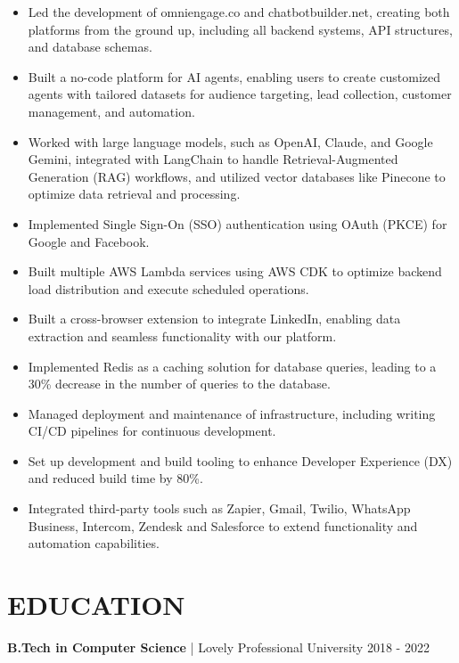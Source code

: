 \documentclass[]{resume}
\begin{document}
\begin{itemize}
  \item Led the development of omniengage.co and chatbotbuilder.net, creating both platforms from the ground up, including all backend systems, API structures, and database schemas.
  \item Built a no-code platform for AI agents, enabling users to create customized agents with tailored datasets for audience targeting, lead collection, customer management, and automation.
  \item Worked with large language models, such as OpenAI, Claude, and Google Gemini, integrated with LangChain to handle Retrieval-Augmented Generation (RAG) workflows, and utilized vector databases like Pinecone to optimize data retrieval and processing.
  \item Implemented Single Sign-On (SSO) authentication using OAuth (PKCE) for Google and Facebook.
  \item Built multiple AWS Lambda services using AWS CDK to optimize backend load distribution and execute scheduled operations.
  \item Built a cross-browser extension to integrate LinkedIn, enabling data extraction and seamless functionality with our platform.
  \item Implemented Redis as a caching solution for database queries, leading to a 30\% decrease in the number of queries to the database.
  \item Managed deployment and maintenance of infrastructure, including writing CI/CD pipelines for continuous development.
  \item Set up development and build tooling to enhance Developer Experience (DX) and reduced build time by 80\%.
  \item Integrated third-party tools such as Zapier, Gmail, Twilio, WhatsApp Business, Intercom, Zendesk and Salesforce to extend functionality and automation capabilities.
\end{itemize}

\section{EDUCATION}
\textbf{B.Tech in Computer Science} | Lovely Professional University  \hfill 2018 - 2022
\end{document}
